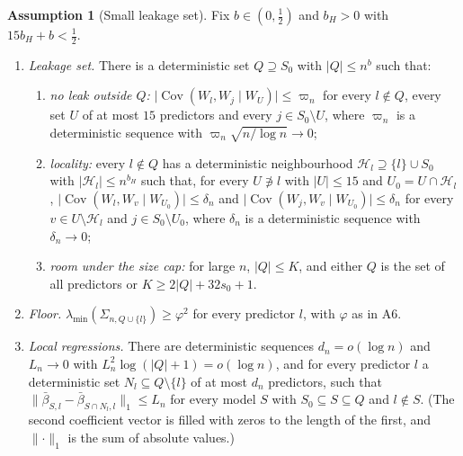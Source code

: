 \documentclass[11pt]{article}
\newcommand{\abs}[1]{\lvert #1\rvert}
\newcommand{\norm}[1]{\lVert #1\rVert}
\newcommand{\Cov}{\operatorname{Cov}}
\newcommand{\lmin}{\lambda_{\min}}
\newcommand{\Sz}{S_0}
\newcommand{\sz}{s_0}
\newcommand{\Hl}{\mathcal H}
\theoremstyle{plain}
\theoremstyle{definition}
\newtheorem{asm}{Assumption}
\begin{document}
\begin{asm}[Small leakage set]\label{a:leak}
Fix $b\in(0,\tfrac12)$ and $b_H>0$ with $15b_H+b<\tfrac12$.
\begin{enumerate}[label=(\alph*)]
  \item \emph{Leakage set.} There is a deterministic set $Q\supseteq\Sz$ with $\abs{Q}\le n^b$ such that:
    \begin{enumerate}[label=(\roman*),leftmargin=1.8em]
      \item \emph{no leak outside $Q$:} $\abs{\Cov(W_l,W_j\mid W_U)}\le\varpi_n$ for every $l\notin Q$, every set $U$ of
        at most $15$ predictors and every $j\in\Sz\setminus U$, where $\varpi_n$ is a deterministic sequence with
        $\varpi_n\sqrt{n/\log n}\to0$;
      \item \emph{locality:} every $l\notin Q$ has a deterministic neighbourhood $\Hl_l\supseteq\{l\}\cup\Sz$ with
        $\abs{\Hl_l}\le n^{b_H}$ such that, for every $U\not\ni l$ with $\abs{U}\le15$ and $U_0=U\cap\Hl_l$,
        $\abs{\Cov(W_l,W_v\mid W_{U_0})}\le\delta_n$ and $\abs{\Cov(W_j,W_v\mid W_{U_0})}\le\delta_n$ for every
        $v\in U\setminus\Hl_l$ and $j\in\Sz\setminus U_0$, where $\delta_n$ is a deterministic sequence with
        $\delta_n\to0$;
      \item \emph{room under the size cap:} for large $n$, $\abs{Q}\le K$, and either $Q$ is the set of all predictors or
        $K\ge2\abs{Q}+32\sz+1$.
    \end{enumerate}
  \item \emph{Floor.} $\lmin(\Sigma_{n,Q\cup\{l\}})\ge\varphi^2$ for every predictor $l$, with $\varphi$ as in A6.
  \item \emph{Local regressions.} There are deterministic sequences $d_n=o(\log n)$ and $L_n\to0$ with
    $L_n^2\log(\abs{Q}+1)=o(\log n)$, and for every predictor $l$ a deterministic set $N_l\subseteq Q\setminus\{l\}$ of at
    most $d_n$ predictors, such that $\norm{\bar\beta_{S,l}-\bar\beta_{S\cap N_l,l}}_1\le L_n$ for every model $S$ with
    $\Sz\subseteq S\subseteq Q$ and $l\notin S$. (The second coefficient vector is filled with zeros to the length of the
    first, and $\norm{\cdot}_1$ is the sum of absolute values.)
\end{enumerate}
\end{asm}
\end{document}
